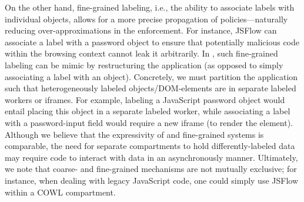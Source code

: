 On the other hand, fine-grained labeling, i.e., the ability to associate labels with
individual objects, allows for a more precise propagation of
policies---naturally reducing over-approximations in the enforcement. 
%
For instance, JSFlow can associate a label with a password object
to ensure that potentially malicious code within the browsing context
cannot leak it arbitrarily.
%
In \sys{}, such fine-grained labeling can be mimic by restructuring the
application (as opposed to simply associating a label with an object).
%
Concretely, we must partition the application such that
heterogeneously labeled objects/DOM-elements are in separate labeled
workers or iframes.
%
For example, labeling a JavaScript password object would entail
placing this object in a separate labeled worker, while associating a
label with a password-input field would require a new iframe (to
render the element).
%
Although we believe that the expressivity of \sys{} 
and fine-grained systems is comparable, the need for separate compartments
to hold differently-labeled data may require code to interact with 
data in an asynchronously manner. 
%
Ultimately, we note that coarse- and fine-grained mechanisms are not mutually
exclusive; for instance, when dealing with legacy JavaScript code, one
could simply use JSFlow within a COWL compartment. 




